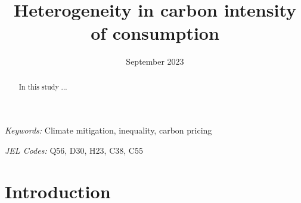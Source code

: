 \documentclass[12pt, a4paper]{article}
\title{Heterogeneity in carbon intensity of consumption}
\date{September 2023}
\begin{document}
\maketitle
\begin{abstract}
  In this study ...
\end{abstract}

\smallskip

\noindent \small \textit{Keywords:} Climate mitigation, inequality, carbon pricing

\noindent \small \textit{JEL Codes:} Q56, D30, H23, C38, C55

\thispagestyle{empty}
\clearpage
\setcounter{page}{1}

\section{Introduction} \label{sec:introduction}
\end{document}
